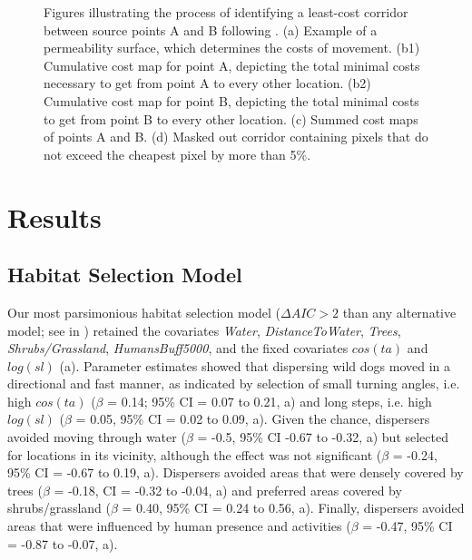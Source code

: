 \documentclass[abstract=on,10pt,a4paper,bibliography=totocnumbered]{scrartcl}
\begin{document}
\begin{figure}[hbtp]
\begin{center}
  \caption{Figures illustrating the process of identifying a least-cost corridor
  between source points A and B following \cite{Pinto.2009}. (a) Example of a
  permeability surface, which determines the costs of movement. (b1) Cumulative
  cost map for point A, depicting the total minimal costs necessary to get from
  point A to every other location. (b2) Cumulative cost map for point B,
  depicting the total minimal costs to get from point B to every other location.
  (c) Summed cost maps of points A and B. (d) Masked out corridor containing
  pixels that do not exceed the cheapest pixel by more than 5\%.}
  \label{LCCExample}
  \end{center}
\end{figure}

\newpage
\section{Results}
\subsection{Habitat Selection Model}
Our most parsimonious habitat selection model (\(\Delta AIC > 2\) than any
alternative model; see  in ) retained the covariates
\textit{Water}, \textit{DistanceToWater}, \textit{Trees},
\textit{Shrubs/Grassland}, \textit{HumansBuff5000}, and the fixed covariates
\(cos(ta)\) and \(log(sl)\) (a). Parameter estimates
showed that dispersing wild dogs moved in a directional and fast manner, as
indicated by selection of small turning angles, i.e. high \(cos(ta)\) (\(\beta\)
= 0.14; 95\% CI = 0.07 to 0.21, a) and long steps,
i.e. high \(log(sl)\) (\(\beta\) = 0.05, 95\% CI = 0.02 to 0.09,
a). Given the chance, dispersers avoided moving
through water (\(\beta\) = -0.5, 95\% CI -0.67 to -0.32,
a) but selected for locations in its vicinity,
although the effect was not significant (\(\beta\) = -0.24, 95\% CI = -0.67 to
0.19, a). Dispersers avoided areas that were densely
covered by trees (\(\beta\) = -0.18, CI = -0.32 to -0.04,
a) and preferred areas covered by shrubs/grassland
(\(\beta\) = 0.40, 95\% CI = 0.24 to 0.56, a).
Finally, dispersers avoided areas that were influenced by human presence and
activities (\(\beta\) = -0.47, 95\% CI = -0.87 to -0.07,
a).
\end{document}
